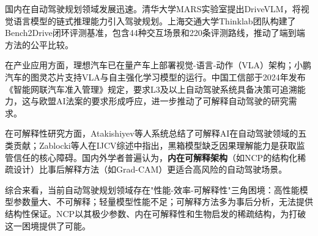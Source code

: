 \xiaosi

国内在自动驾驶规划领域发展迅速。清华大学MARS实验室提出DriveVLM\cite{tian2024drivevlm}，将视觉语言模型的链式推理能力引入驾驶规划。上海交通大学Thinklab团队构建了Bench2Drive\cite{bench2drive2024}闭环评测基准，包含44种交互场景和220条评测路线，推动了端到端方法的公平比较。

在产业应用方面，理想汽车已在量产车上部署视觉-语言-动作（VLA）架构；小鹏汽车的图灵芯片支持VLA与自主强化学习模型的运行。中国工信部于2024年发布《智能网联汽车准入管理》规定，要求L3及以上自动驾驶系统具备决策可追溯能力，这与欧盟AI法案的要求形成呼应，进一步推动了可解释自动驾驶的研究需求。

在可解释性研究方面，Atakishiyev等人\cite{atakishiyev2024xaiad}系统总结了可解释AI在自动驾驶领域的五类贡献；Zablocki等人\cite{zablocki2022xad}在IJCV综述中指出，黑箱模型缺乏因果理解能力是获取监管信任的核心障碍。国内外学者普遍认为，\textbf{内在可解释架构}（如NCP的结构化稀疏设计）比事后解释方法（如Grad-CAM）更适合高风险的自动驾驶场景。

综合来看，当前自动驾驶规划领域存在"性能-效率-可解释性"三角困境：高性能模型参数量大、不可解释；轻量模型性能不足；可解释方法多为事后分析，无法提供结构性保证。NCP以其极少参数、内在可解释性和生物启发的稀疏结构，为打破这一困境提供了可能。

